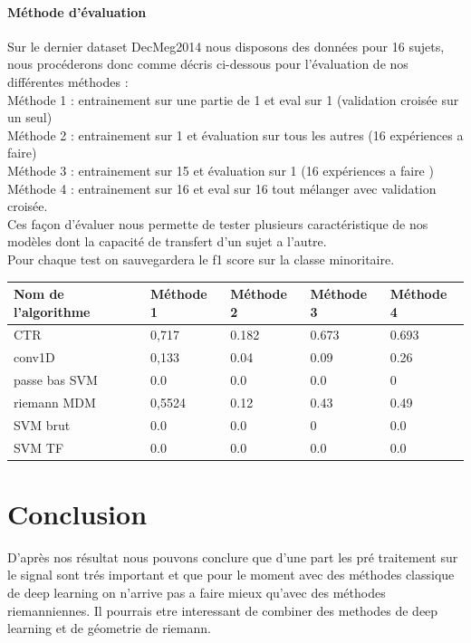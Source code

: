 \documentclass{article}[12pt]
\begin{document}
\subsection{Méthode d'évaluation}
Sur le dernier dataset DecMeg2014 nous disposons des données pour 16 sujets, nous procéderons donc comme décris ci-dessous pour l'évaluation de nos différentes méthodes :\\
Méthode 1 : entrainement sur une partie de 1 et eval sur 1 (validation croisée sur un seul)\\
Méthode 2 : entrainement sur 1 et évaluation sur tous les autres (16 expériences a faire)\\
Méthode 3 : entrainement sur 15 et évaluation sur 1 (16 expériences a faire )\\
Méthode 4 : entrainement sur 16 et eval sur 16 tout mélanger avec validation croisée.
\\
Ces façon d'évaluer nous permette de tester plusieurs caractéristique de nos modèles dont la capacité de transfert d'un sujet a l'autre.
\\
Pour chaque test on sauvegardera le f1 score sur la classe minoritaire.
\begin{table}[]
\begin{tabular}{|l|l|l|l|l|}
\hline
Nom de l’algorithme & Méthode 1         & Méthode 2           & Méthode 3          & Méthode 4          \\
\hline
CTR                 & 0,717 & 0.182 & 0.673 & 0.693 \\
conv1D              & 0,133         & 0.04                & 0.09               & 0.26               \\
passe bas SVM       & 0.0                & 0.0                   & 0.0                  & 0                  \\
riemann MDM         & 0,5524            & 0.12                & 0.43               & 0.49               \\
SVM brut            & 0.0                 & 0.0                   & 0                  & 0.0                  \\
SVM TF              & 0.0                 & 0.0                   & 0.0                  & 0.0      \\
\hline           
\end{tabular}
\end{table}
\part{Conclusion}
D'après nos résultat nous pouvons conclure que d'une part les pré traitement sur le signal sont trés important et que pour le moment avec des méthodes classique de deep learning on n'arrive pas a faire mieux qu'avec des méthodes riemanniennes. Il pourrais etre interessant de combiner des methodes de deep learning et de géometrie de riemann.

 
\end{document}
